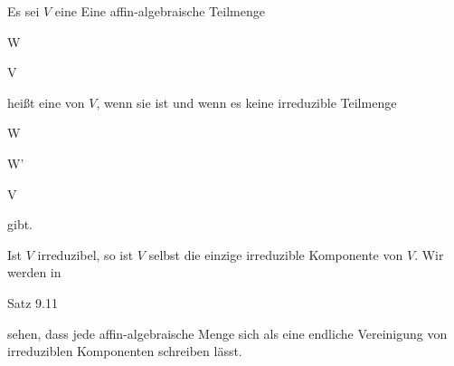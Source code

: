 

{}


{


Es sei $V$ eine
Eine affin-algebra\-ische Teilmenge


\mavergleichskette


{\vergleichskette


{W
}


{ \subseteq }{ V
}


{  }{
}


{    }{
}


{   }{
}


}
{}{}{}
heißt eine  von $V$, wenn sie
ist und wenn es keine irreduzible Teilmenge


\mavergleichskette


{\vergleichskette


{W
}


{ \subset }{ W'
}


{ \subseteq }{ V
}


{    }{
}


{   }{
}


}
{}{}{}
gibt.


}


Ist $V$ irreduzibel, so ist $V$ selbst die einzige irreduzible Komponente von $V$. Wir werden in

Satz 9.11

sehen, dass jede affin-algebraische Menge sich als eine endliche Vereinigung von irreduziblen Komponenten schreiben lässt.




